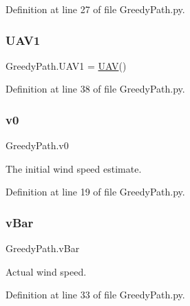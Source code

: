 Definition at line 27 of file Greedy\+Path.\+py.

\mbox{\label{namespace_greedy_path_a133ae9f113d9f694f9506cb6bad87f91}} 
\subsubsection{\texorpdfstring{U\+A\+V1}{UAV1}}
{\footnotesize\ttfamily Greedy\+Path.\+U\+A\+V1 = \mbox{\hyperlink{classpath_plan_1_1_u_a_v}{U\+AV}}()}



Definition at line 38 of file Greedy\+Path.\+py.

\mbox{\label{namespace_greedy_path_ac3503601b08d4fc59e5cbc91d32492f0}} 
\subsubsection{\texorpdfstring{v0}{v0}}
{\footnotesize\ttfamily Greedy\+Path.\+v0}



The initial wind speed estimate. 



Definition at line 19 of file Greedy\+Path.\+py.

\mbox{\label{namespace_greedy_path_a03451064d5350073da9cb253f7684576}} 
\subsubsection{\texorpdfstring{v\+Bar}{vBar}}
{\footnotesize\ttfamily Greedy\+Path.\+v\+Bar}



Actual wind speed. 



Definition at line 33 of file Greedy\+Path.\+py.

\mbox{\label{namespace_greedy_path_a0b686e13d9e46e185e611dc0b5d92e8f}} 
